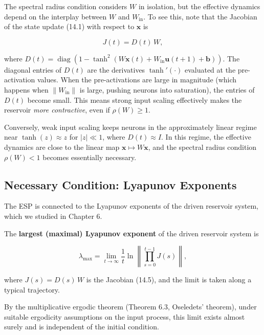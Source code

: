 The spectral radius condition considers $W$ in isolation, but the effective dynamics depend on the interplay between $W$ and $W_{\text{in}}$. To see this, note that the Jacobian of the state update (14.1) with respect to $\mathbf{x}$ is

\begin{equation}\label{eq:14.5}\tag{14.5}
J(t) = D(t)\, W,
\end{equation}

where $D(t) = \operatorname{diag}\!\left(1 - \tanh^2(W\mathbf{x}(t) + W_{\text{in}}\mathbf{u}(t+1) + \mathbf{b})\right)$. The diagonal entries of $D(t)$ are the derivatives $\tanh'(\cdot)$ evaluated at the pre-activation values. When the pre-activations are large in magnitude (which happens when $\|W_{\text{in}}\|$ is large, pushing neurons into saturation), the entries of $D(t)$ become small. This means strong input scaling effectively makes the reservoir \textit{more contractive}, even if $\rho(W) \geq 1$.

Conversely, weak input scaling keeps neurons in the approximately linear regime near $\tanh(z) \approx z$ for $|z| \ll 1$, where $D(t) \approx I$. In this regime, the effective dynamics are close to the linear map $\mathbf{x} \mapsto W\mathbf{x}$, and the spectral radius condition $\rho(W) < 1$ becomes essentially necessary.

\subsection{Necessary Condition: Lyapunov Exponents}\label{sec:14.3.3}

The ESP is connected to the Lyapunov exponents of the driven reservoir system, which we studied in Chapter 6.

\begin{definition}\label{def:14.2.}
The \textbf{largest (maximal) Lyapunov exponent} of the driven reservoir system is

\begin{equation}\label{eq:14.6}\tag{14.6}
\lambda_{\max} = \lim_{t \to \infty} \frac{1}{t} \ln \left\| \prod_{s=0}^{t-1} J(s) \right\|,
\end{equation}

where $J(s) = D(s)\, W$ is the Jacobian (14.5), and the limit is taken along a typical trajectory.

By the multiplicative ergodic theorem (Theorem 6.3, Oseledets' theorem), under suitable ergodicity assumptions on the input process, this limit exists almost surely and is independent of the initial condition.
\end{definition}


